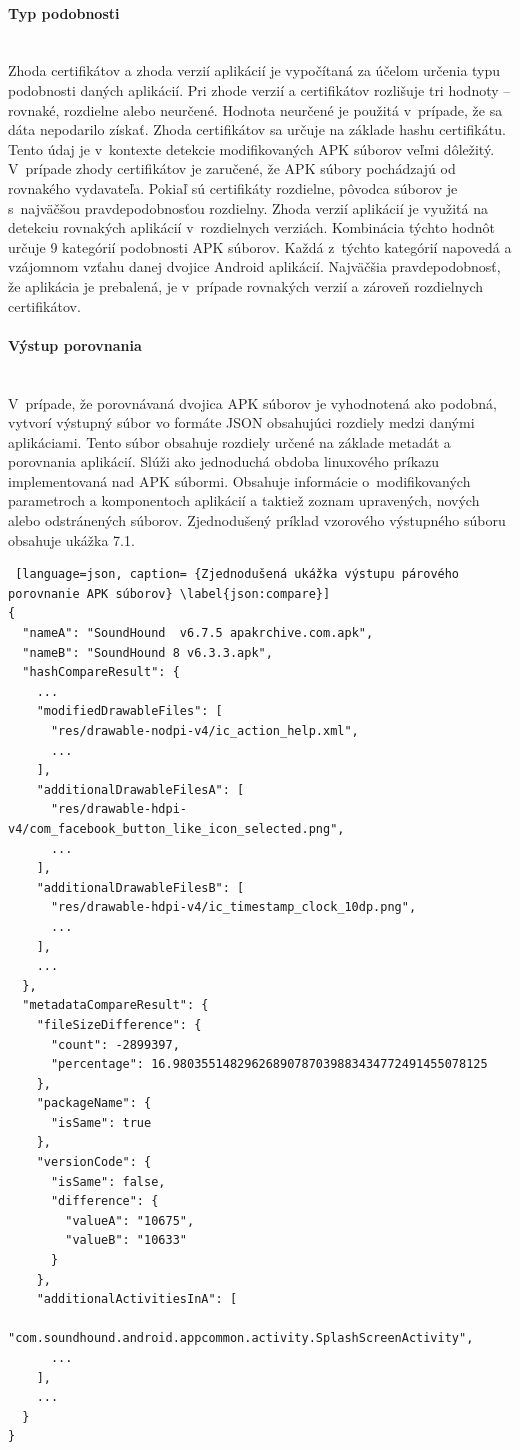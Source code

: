 \paragraph{Typ podobnosti}\mbox{}\\
Zhoda certifikátov a zhoda verzií aplikácií je vypočítaná za účelom určenia typu podobnosti daných aplikácií. Pri zhode verzií a certifikátov rozlišuje tri hodnoty – rovnaké, rozdielne alebo neurčené. Hodnota neurčené je použitá v~prípade, že sa dáta nepodarilo získať. Zhoda certifikátov sa určuje na základe hashu certifikátu. Tento údaj je v~kontexte detekcie modifikovaných APK súborov veľmi dôležitý. V~prípade zhody certifikátov je zaručené, že APK súbory pochádzajú od rovnakého vydavateľa. Pokiaľ sú certifikáty rozdielne, pôvodca súborov je s~najväčšou pravdepodobnosťou rozdielny. Zhoda verzií aplikácií je využitá na detekciu rovnakých aplikácií v~rozdielnych verziách.
Kombinácia týchto hodnôt určuje 9 kategórií podobnosti APK súborov. Každá z~týchto kategórií napovedá a vzájomnom vzťahu danej dvojice Android aplikácií. Najväčšia pravdepodobnosť, že aplikácia je prebalená, je v~prípade rovnakých verzií a zároveň rozdielnych certifikátov. 

\paragraph{Výstup porovnania}\mbox{}\\
V~prípade, že porovnávaná dvojica APK súborov je vyhodnotená ako podobná,  vytvorí výstupný súbor vo formáte JSON obsahujúci rozdiely medzi danými aplikáciami. Tento súbor obsahuje rozdiely určené na základe metadát a porovnania aplikácií. Slúži ako jednoduchá obdoba linuxového príkazu  implementovaná nad APK súbormi. Obsahuje informácie o~modifikovaných parametroch a komponentoch aplikácií a taktiež zoznam upravených, nových alebo odstránených súborov. Zjednodušený príklad vzorového výstupného súboru obsahuje ukážka 7.1.
\begin{lstlisting} [language=json, caption= {Zjednodušená ukážka výstupu párového porovnanie APK súborov} \label{json:compare}]
{
  "nameA": "SoundHound  v6.7.5 apakrchive.com.apk",
  "nameB": "SoundHound 8 v6.3.3.apk",
  "hashCompareResult": {
    ...
    "modifiedDrawableFiles": [
      "res/drawable-nodpi-v4/ic_action_help.xml",
      ...
    ],
    "additionalDrawableFilesA": [
      "res/drawable-hdpi-v4/com_facebook_button_like_icon_selected.png",
      ...
    ],
    "additionalDrawableFilesB": [
      "res/drawable-hdpi-v4/ic_timestamp_clock_10dp.png",
      ...
    ],
    ...
  },
  "metadataCompareResult": {
    "fileSizeDifference": {
      "count": -2899397,
      "percentage": 16.98035514829626890787039883434772491455078125
    },
    "packageName": {
      "isSame": true
    },
    "versionCode": {
      "isSame": false,
      "difference": {
        "valueA": "10675",
        "valueB": "10633"
      }
    },
    "additionalActivitiesInA": [
      "com.soundhound.android.appcommon.activity.SplashScreenActivity",
      ...
    ],
    ...
  }
}
\end{lstlisting}

